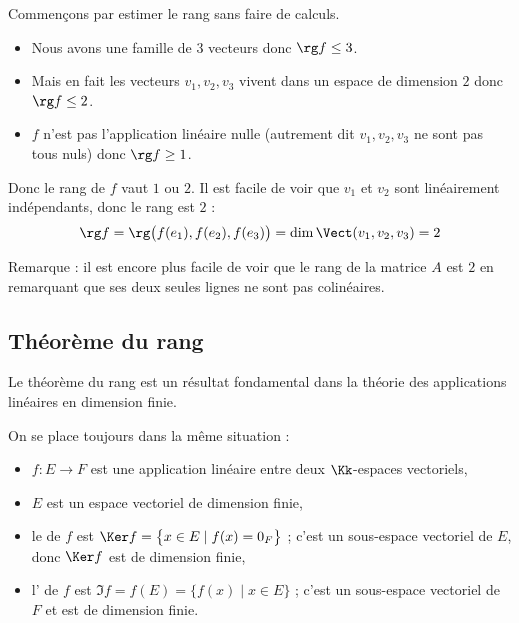 \documentclass[class=report,crop=false]{standalone}
\begin{document}
\begin{exemple}
Commençons par estimer le rang sans faire de calculs.
\begin{itemize}
  \item Nous avons une famille de $3$ vecteurs donc $\rg f \le 3$.
  \item Mais en fait les vecteurs $v_1,v_2,v_3$ vivent dans un espace de dimension $2$ donc
  $\rg f \le 2$.

  \item $f$ n'est pas l'application linéaire nulle (autrement dit $v_1,v_2,v_3$ ne sont pas tous nuls)
  donc $\rg f \ge 1$.
\end{itemize}

Donc le rang de $f$ vaut $1$ ou $2$.
Il est facile de voir que $v_1$ et $v_2$ sont linéairement indépendants, donc
le rang est $2$ :
$$\rg f = \rg \big(f(e_1), f(e_2), f(e_3) \big) = \dim \Vect (v_1, v_2, v_3) = 2$$

Remarque : il est encore plus facile de voir que le rang de la matrice $A$ est $2$
en remarquant que ses deux seules lignes ne sont pas colinéaires.
\end{exemple}





\subsection{Théorème du rang}

Le  théorème du rang est un résultat fondamental dans la théorie des
applications linéaires en dimension finie.

On se place toujours dans la même situation :
\begin{itemize}
  \item $f : E \to F$ est une application linéaire entre deux $\Kk$-espaces
  vectoriels,

  \item $E$ est un espace vectoriel de dimension finie,

  \item le  de $f$ est $\Ker f=\big\{x \in E \mid f(x)=0_{F}\big\}$ ;
  c'est un sous-espace vectoriel de $E$, donc $\Ker f$ est de dimension finie,

  \item l' de $f$ est $\Im f = f(E) = \big\{ f(x) \mid x \in E \big\}$ ;
  c'est un sous-espace vectoriel de $F$ et est de dimension finie.
\end{itemize}
\end{document}
